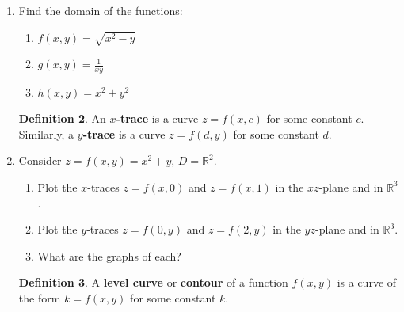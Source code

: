 \documentclass[12pt]{amsart}
\newcommand{\R}{\mathbb{R}}
\theoremstyle{definition}
\newtheorem*{definition}{Definition}
\begin{document}
\begin{enumerate}[itemsep=2.5em,leftmargin=0pt]
\vspace{2.5em}

\begin{definition}
    The {\bf domain} of a function is the set of all inputs where the function is defined.
\end{definition}

\vspace{-2em}

\item Find the domain of the functions:
\begin{enumerate}
    \item $f(x,y)=\sqrt{x^2-y}$
    \item $g(x,y)=\frac{1}{xy}$
    \item $h(x,y)=x^2+y^2$
\end{enumerate}

\vspace{2.5em}

\begin{definition}
    An {\bf $x$-trace} is a curve $z=f(x,c)$ for some constant $c$. Similarly, a {\bf $y$-trace} is a curve $z=f(d,y)$ for some constant $d$.
\end{definition}

\vspace{-2em}

\item Consider $z=f(x,y)=x^2+y$, $D=\R^2$.
\begin{enumerate}
    \item Plot the $x$-traces $z=f(x,0)$ and $z=f(x,1)$ in the $xz$-plane and in $\R^3$.
    \item Plot the $y$-traces $z=f(0,y)$ and $z=f(2,y)$ in the $yz$-plane and in $\R^3$.
    \item What are the graphs of each?
\end{enumerate}

\vspace{2.5em}

\begin{definition}
    A {\bf level curve} or {\bf contour} of a function $f(x,y)$ is a curve of the form $k=f(x,y)$ for some constant $k$.
\end{definition}

\vspace{-2em}


\end{enumerate}
\end{document}
